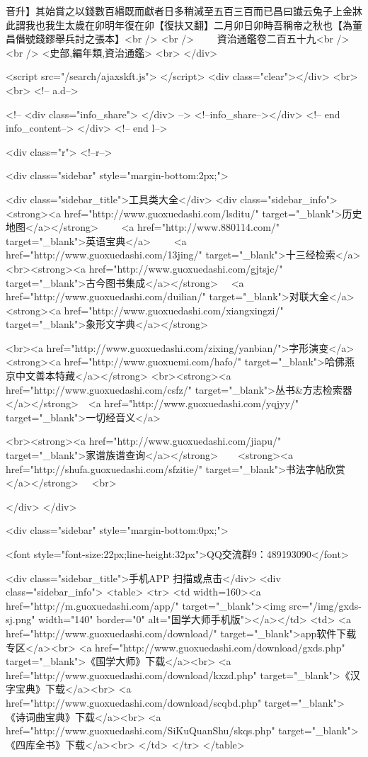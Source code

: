 音升】其始賞之以錢數百緡既而獻者日多稍減至五百三百而已昌曰䜟云兔子上金牀此謂我也我生太歲在卯明年復在卯【復扶又翻】二月卯日卯時吾稱帝之秋也【為董昌僭號錢鏐舉兵討之張本】<br />
<br />
　　資治通鑑卷二百五十九<br />
<br />
<史部,編年類,資治通鑑>  <br>
   </div> 

<script src="/search/ajaxskft.js"> </script>
 <div class="clear"></div>
<br>
<br>
 <!-- a.d-->

 <!--
<div class="info_share">
</div> 
-->
 <!--info_share--></div>   <!-- end info_content-->
  </div> <!-- end l-->

<div class="r">   <!--r-->



<div class="sidebar"  style="margin-bottom:2px;">

 
<div class="sidebar_title">工具类大全</div>
<div class="sidebar_info">
<strong><a href="http://www.guoxuedashi.com/lsditu/" target="_blank">历史地图</a></strong>　　
<a href="http://www.880114.com/" target="_blank">英语宝典</a>　　
<a href="http://www.guoxuedashi.com/13jing/" target="_blank">十三经检索</a>　
<br><strong><a href="http://www.guoxuedashi.com/gjtsjc/" target="_blank">古今图书集成</a></strong>　
<a href="http://www.guoxuedashi.com/duilian/" target="_blank">对联大全</a>　<strong><a href="http://www.guoxuedashi.com/xiangxingzi/" target="_blank">象形文字典</a></strong>　

<br><a href="http://www.guoxuedashi.com/zixing/yanbian/">字形演变</a>　　<strong><a href="http://www.guoxuemi.com/hafo/" target="_blank">哈佛燕京中文善本特藏</a></strong>
<br><strong><a href="http://www.guoxuedashi.com/csfz/" target="_blank">丛书&方志检索器</a></strong>　<a href="http://www.guoxuedashi.com/yqjyy/" target="_blank">一切经音义</a>　　

<br><strong><a href="http://www.guoxuedashi.com/jiapu/" target="_blank">家谱族谱查询</a></strong>　　<strong><a href="http://shufa.guoxuedashi.com/sfzitie/" target="_blank">书法字帖欣赏</a></strong>　
<br>

</div>
</div>


<div class="sidebar" style="margin-bottom:0px;">

<font style="font-size:22px;line-height:32px">QQ交流群9：489193090</font>


<div class="sidebar_title">手机APP 扫描或点击</div>
<div class="sidebar_info">
<table>
<tr>
	<td width=160><a href="http://m.guoxuedashi.com/app/" target="_blank"><img src="/img/gxds-sj.png" width="140"  border="0" alt="国学大师手机版"></a></td>
	<td>
<a href="http://www.guoxuedashi.com/download/" target="_blank">app软件下载专区</a><br>
<a href="http://www.guoxuedashi.com/download/gxds.php" target="_blank">《国学大师》下载</a><br>
<a href="http://www.guoxuedashi.com/download/kxzd.php" target="_blank">《汉字宝典》下载</a><br>
<a href="http://www.guoxuedashi.com/download/scqbd.php" target="_blank">《诗词曲宝典》下载</a><br>
<a href="http://www.guoxuedashi.com/SiKuQuanShu/skqs.php" target="_blank">《四库全书》下载</a><br>
</td>
</tr>
</table>

